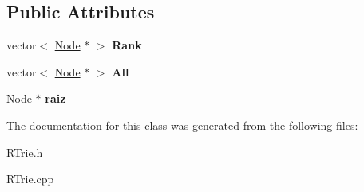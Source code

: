 \subsection*{Public Attributes}
\begin{DoxyCompactItemize}
\item 
\hypertarget{classRTrie_ad0f3a424f136831887018e5bfa1a6b7e}{
vector$<$ \hyperlink{classNode}{Node} $\ast$ $>$ {\bfseries Rank}}
\label{classRTrie_ad0f3a424f136831887018e5bfa1a6b7e}

\item 
\hypertarget{classRTrie_a7ef4bfc0d8dc5f8512f2ee19e08e2481}{
vector$<$ \hyperlink{classNode}{Node} $\ast$ $>$ {\bfseries All}}
\label{classRTrie_a7ef4bfc0d8dc5f8512f2ee19e08e2481}

\item 
\hypertarget{classRTrie_aab8d5976ce7a8c232967ebe6cf600f8d}{
\hyperlink{classNode}{Node} $\ast$ {\bfseries raiz}}
\label{classRTrie_aab8d5976ce7a8c232967ebe6cf600f8d}

\end{DoxyCompactItemize}


The documentation for this class was generated from the following files:\begin{DoxyCompactItemize}
\item 
RTrie.h\item 
RTrie.cpp\end{DoxyCompactItemize}
